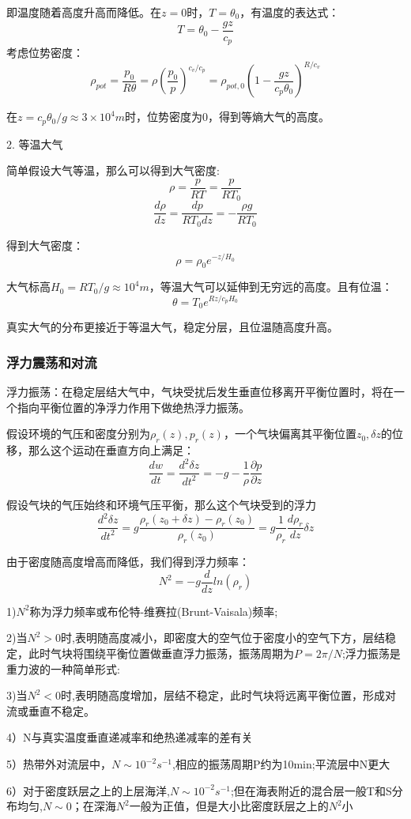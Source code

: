\documentclass{article}
\begin{document}
即温度随着高度升高而降低。在$z=0$时，$T=\theta_0$，有温度的表达式：
$$T=\theta_0-\frac{gz}{c_p}$$
考虑位势密度：
$$\rho_{pot} =\frac{p_0}{R\theta}=\rho(\frac{p_0}{p})^{c_v/c_p}=\rho_{pot,0}(1-\frac{gz}{c_p\theta_0})^{R/c_v}$$

在$z=c_p\theta_0/g\approx3\times10^4m$时，位势密度为$0$，得到等熵大气的高度。

2. 等温大气

简单假设大气等温，那么可以得到大气密度:
$$\rho = \frac{p}{RT}=\frac{p}{RT_0}$$
$$\frac{d\rho}{dz}=\frac{dp}{RT_0dz}=-\frac{\rho g}{RT_0}$$

得到大气密度：
$$\rho = \rho_0 e^{-z/H_0}$$

大气标高$H_0=RT_0/g\approx10^4m$，等温大气可以延伸到无穷远的高度。且有位温：
$$\theta = T_0e^{Rz/c_pH_0}$$

真实大气的分布更接近于等温大气，稳定分层，且位温随高度升高。

\subsubsection{浮力震荡和对流}

浮力振荡：在稳定层结大气中，气块受扰后发生垂直位移离开平衡位置时，将在一个指向平衡位置的净浮力作用下做绝热浮力振荡。

假设环境的气压和密度分别为$\rho_r(z), p_r(z)$，一个气块偏离其平衡位置$z_0, \delta z$的位移，那么这个运动在垂直方向上满足：
$$\frac{dw}{dt}=\frac{d^2\delta z}{dt^2}=-g-\frac{1}{\rho}\frac{\partial p}{\partial z}$$

假设气块的气压始终和环境气压平衡，那么这个气块受到的浮力
$$\frac{d^2\delta z}{dt^2}=g\frac{\rho_r(z_0+\delta z)-\rho_r(z_0)}{\rho_r(z_0)}
=g\frac{1}{\rho_r}\frac{d\rho_r}{dz}\delta z$$

由于密度随高度增高而降低，我们得到浮力频率：
$$N^2=-g\frac{d}{dz}ln(\rho_r)$$

1)$N^2$称为浮力频率或布伦特-维赛拉(Brunt-Vaisala)频率;

2)当$N^2>0$时,表明随高度减小，即密度大的空气位于密度小的空气下方，层结稳定，此时气块将围绕平衡位置做垂直浮力振荡，振荡周期为$P=2\pi/N$;浮力振荡是重力波的一种简单形式:

3)当$N^2<0$时,表明随高度增加，层结不稳定，此时气块将远离平衡位置，形成对流或垂直不稳定。

4）N与真实温度垂直递减率和绝热递减率的差有关

5）热带外对流层中，$N\sim10^{-2}s^{-1}$,相应的振荡周期P约为10min;平流层中N更大

6）对于密度跃层之上的上层海洋,$N\sim10^{-2}s^{-1}$;但在海表附近的混合层一般T和S分布均匀,$N\sim0$；在深海$N^2$一般为正值，但是大小比密度跃层之上的$N^2$小
\end{document}
